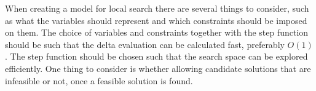 When creating a model for local search there are several things to consider, such as what 
the variables should represent and which constraints should be imposed on them. The choice of variables and constraints 
together with the step function should be such that the delta evaluation can be calculated fast, preferably $O(1)$. The 
step function should be chosen such that the search space can be explored efficiently. One thing to consider is whether 
allowing candidate solutions that are infeasible or not, once a feasible solution is found.  